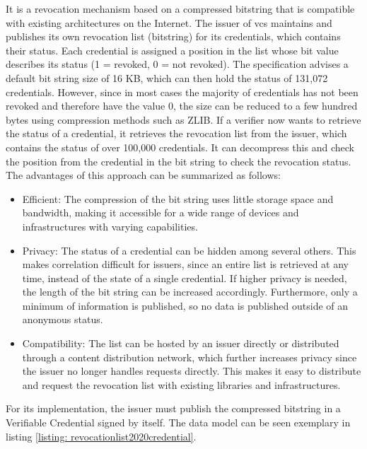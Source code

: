        It is a revocation mechanism based on a compressed bitstring that is compatible with existing architectures on the Internet. The issuer of \acp{vc} maintains and publishes its own revocation list (bitstring) for its credentials, which contains their status. Each credential is assigned a position in the list whose bit value describes its status (1 = revoked, 0 = not revoked). The specification advises a default bit string size of 16 KB, which can then hold the status of 131,072 credentials. However, since in most cases the majority of credentials has not been revoked and therefore have the value 0, the size can be reduced to a few hundred bytes using compression methods such as ZLIB. If a verifier now wants to retrieve the status of a credential, it retrieves the revocation list from the issuer, which contains the status of over 100,000 credentials. It can decompress this and check the position from the credential in the bit string to check the revocation status. The advantages of this approach can be summarized as follows: \cite{longley_revocation_2021}
        
        \begin{itemize}
            \item Efficient: The compression of the bit string uses little storage space and bandwidth, making it accessible for a wide range of devices and infrastructures with varying capabilities. 
            \item Privacy: The status of a credential can be hidden among several others. This makes correlation difficult for issuers, since an entire list is retrieved at any time, instead of the state of a single credential. If higher privacy is needed, the length of the bit string can be increased accordingly. Furthermore, only a minimum of information is published, so no data is published outside of an anonymous status.
            \item Compatibility: The list can be hosted by an issuer directly or distributed through a content distribution network, which further increases privacy since the issuer no longer handles requests directly. This makes it easy to distribute and request the revocation list with existing libraries and infrastructures.
        \end{itemize}
        
        For its implementation, the issuer must publish the compressed bitstring in a Verifiable Credential signed by itself. The data model can be seen exemplary in listing \ref{listing: revocationlist2020credential}.
        \newline

